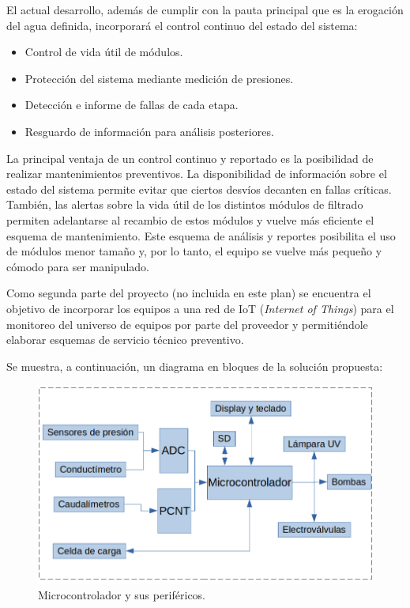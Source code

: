 \documentclass[
11pt, %
]{charter}
\begin{document}
El actual desarrollo, además de cumplir con la pauta principal que es la erogación del agua definida, incorporará el control continuo del estado del sistema:
\begin{itemize}
	\item Control de vida útil de módulos.
	\item Protección del sistema mediante medición de presiones.
	\item Detección e informe de fallas de cada etapa.
	\item Resguardo de información para análisis posteriores.
\end{itemize}

La principal ventaja de un control continuo y reportado es la posibilidad de realizar mantenimientos preventivos. La disponibilidad de información sobre el estado del sistema permite evitar que ciertos desvíos decanten en fallas críticas. 
También, las alertas sobre la vida útil de los distintos módulos de filtrado permiten adelantarse al recambio de estos módulos y vuelve más eficiente el esquema de mantenimiento. Este esquema de análisis y reportes posibilita el uso de módulos menor tamaño y, por lo tanto, el equipo se vuelve más pequeño y cómodo para ser manipulado.


Como segunda parte del proyecto (no incluida en este plan) se encuentra el objetivo de incorporar los equipos a una red de IoT (\textit{Internet of Things}) para el monitoreo del universo de equipos por parte del proveedor y permitiéndole elaborar esquemas de servicio técnico preventivo.

Se muestra, a continuación, un diagrama en bloques de la solución propuesta:

\begin{figure}[htpb]
\centering 
\includegraphics[width=.7\textwidth]{./Figuras/Microcontrolador y sus perifericos.png}
\caption{Microcontrolador y sus periféricos.}
\label{fig:microcontroladorConexiones}
\end{figure}
\end{document}
